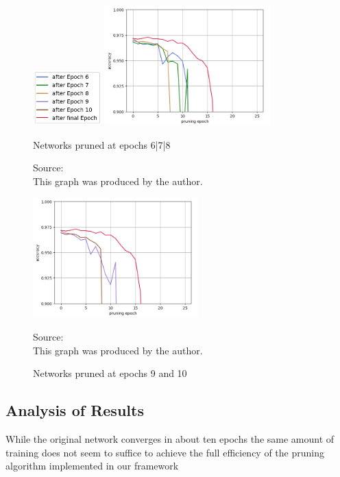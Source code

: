 \begin{figure}
	\begin{minipage}{\textwidth}
		\centering
		\includegraphics[width=100px]{gfx/7-Evaluation/LTH_6_legend.png}
	\end{minipage}
	\begin{minipage}{0.45\textwidth}
		\centering
		\includegraphics[height=175px]{gfx/Experiments/EarlyTicket-MNIST-FCN/678.png}
		\caption{Networks pruned at epochs 6|7|8}
		\vspace{7pt}
		\footnotesize{
			Source:\\
			This graph was produced by the author.
		}
		\label{fig:Early-Tickets-6}
	\end{minipage}\hfill
	\begin{minipage}{0.45\textwidth}
		\centering
		\includegraphics[height=175px]{gfx/Experiments/EarlyTicket-MNIST-FCN/910.png}
		\caption{Networks pruned at epochs 9 and 10}
		\vspace{7pt}
		\footnotesize{
			Source:\\
			This graph was produced by the author.
		}
		\label{fig:Early-Tickets-9}
	\end{minipage}
\end{figure}
\subsection*{Analysis of Results}
While the original network converges in about ten epochs the same amount of training does not seem to suffice to achieve the full efficiency of the pruning algorithm implemented in our framework
